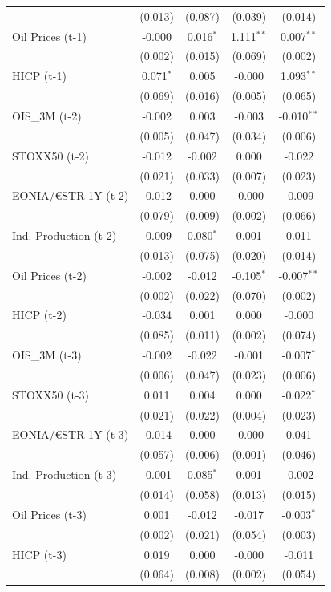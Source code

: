 \begin{longtable}[t]{lcccc}
 & (0.013) & (0.087) & (0.039) & (0.014)\\
Oil Prices (t-1) & -0.000 & 0.016$^{*}$ & 1.111$^{**}$ & 0.007$^{**}$\\
 & (0.002) & (0.015) & (0.069) & (0.002)\\
HICP (t-1) & 0.071$^{*}$ & 0.005 & -0.000 & 1.093$^{**}$\\
 & (0.069) & (0.016) & (0.005) & (0.065)\\
OIS\_3M (t-2) & -0.002 & 0.003 & -0.003 & -0.010$^{**}$\\
 & (0.005) & (0.047) & (0.034) & (0.006)\\
STOXX50 (t-2) & -0.012 & -0.002 & 0.000 & -0.022\\
 & (0.021) & (0.033) & (0.007) & (0.023)\\
EONIA/€STR 1Y (t-2) & -0.012 & 0.000 & -0.000 & -0.009\\
 & (0.079) & (0.009) & (0.002) & (0.066)\\
Ind. Production (t-2) & -0.009 & 0.080$^{*}$ & 0.001 & 0.011\\
 & (0.013) & (0.075) & (0.020) & (0.014)\\
Oil Prices (t-2) & -0.002 & -0.012 & -0.105$^{*}$ & -0.007$^{**}$\\
 & (0.002) & (0.022) & (0.070) & (0.002)\\
HICP (t-2) & -0.034 & 0.001 & 0.000 & -0.000\\
 & (0.085) & (0.011) & (0.002) & (0.074)\\
OIS\_3M (t-3) & -0.002 & -0.022 & -0.001 & -0.007$^{*}$\\
 & (0.006) & (0.047) & (0.023) & (0.006)\\
STOXX50 (t-3) & 0.011 & 0.004 & 0.000 & -0.022$^{*}$\\
 & (0.021) & (0.022) & (0.004) & (0.023)\\
EONIA/€STR 1Y (t-3) & -0.014 & 0.000 & -0.000 & 0.041\\
 & (0.057) & (0.006) & (0.001) & (0.046)\\
Ind. Production (t-3) & -0.001 & 0.085$^{*}$ & 0.001 & -0.002\\
 & (0.014) & (0.058) & (0.013) & (0.015)\\
Oil Prices (t-3) & 0.001 & -0.012 & -0.017 & -0.003$^{*}$\\
 & (0.002) & (0.021) & (0.054) & (0.003)\\
HICP (t-3) & 0.019 & 0.000 & -0.000 & -0.011\\
 & (0.064) & (0.008) & (0.002) & (0.054)\\

\end{longtable}
